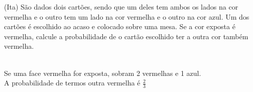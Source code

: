\begin{ex}
(Ita) São dados dois cartões, sendo que um deles tem ambos os lados na cor vermelha e o outro tem um lado na cor vermelha e o outro na cor azul. Um dos cartões é escolhido ao acaso e colocado sobre uma mesa. Se a cor exposta é vermelha, calcule a probabilidade de o cartão escolhido ter a outra cor também vermelha.
  \begin{sol}
   \phantom{A}\\
   Se uma face vermelha for exposta, sobram 2 vermelhas e 1 azul. \\
   A probabilidade de termos outra vermelha é $\frac{2}{3}$ 
  \end{sol}
\end{ex}